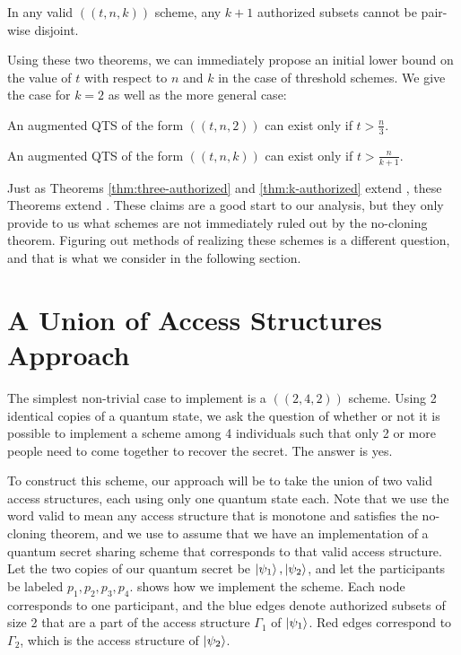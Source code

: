 \begin{theorem}
    \label{thm:k-authorized}
    In any valid $((t,n,k))$ scheme, any $k+1$ authorized subsets cannot be pair-wise disjoint.
\end{theorem}

Using these two theorems, we can immediately propose an initial lower bound on the value of $t$ with respect to $n$ and $k$ in the case of threshold schemes. We give the case for $k=2$ as well as the more general case:

\begin{theorem}
	\label{thm:qts2}
	An augmented QTS of the form $((t,n, 2))$ can exist only if $t > \frac{n}{3}$.
\end{theorem}

\begin{theorem}
	\label{thm:qtsk}
	An augmented QTS of the form $((t,n, k))$ can exist only if $t > \frac{n}{k+1}$.
\end{theorem}

Just as Theorems \ref{thm:three-authorized} and \ref{thm:k-authorized} extend , these Theorems extend . These claims are a good start to our analysis, but they only provide to us what schemes are not immediately ruled out by the no-cloning theorem. Figuring out methods of realizing these schemes is a different question, and that is what we consider in the following section.

\section{A Union of Access Structures Approach}
\label{sec:union-access-structures}

The simplest non-trivial case to implement is a $((2,4,2))$ scheme. Using 2 identical copies of a quantum state, we ask the question of whether or not it is possible to implement a scheme among 4 individuals such that only 2 or more people need to come together to recover the secret. The answer is yes.

To construct this scheme, our approach will be to take the union of two valid access structures, each using only one quantum state each. Note that we use the word valid to mean any access structure that is monotone and satisfies the no-cloning theorem, and we use  to assume that we have an implementation of a quantum secret sharing scheme that corresponds to that valid access structure. Let the two copies of our quantum secret be $\ket{\psi_1}, \ket{\psi_2}$, and let the participants be labeled $p_1, p_2, p_3, p_4$.  shows how we implement the scheme. Each node corresponds to one participant, and the blue edges denote authorized subsets of size 2 that are a part of the access structure $\Gamma_1$ of $\ket{\psi_1}$. Red edges correspond to $\Gamma_2$, which is the access structure of $\ket{\psi_2}$.



